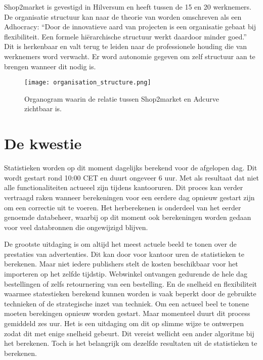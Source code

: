 Shop2market is gevestigd in Hilversum en heeft tussen de 15 en 20 werknemers. De organisatie structuur kan naar de theorie van
\autocite{mintzberg} worden omschreven als een Adhocracy: “Door de innovatieve aard van projecten is een organisatie gebaat bij flexibiliteit. Een formele hiërarchische structuur werkt daardoor minder goed.” Dit is herkenbaar en valt terug te leiden naar de professionele houding die van werknemers word verwacht. Er word autonomie gegeven om zelf structuur aan te brengen wanneer dit nodig is.


\begin{figure}[h]
    \texttt{[image: organisation\_structure.png]}
    \caption{Organogram waarin de relatie tussen Shop2market en Adcurve zichtbaar is.}
    \label{fig:orgchart}
\end{figure}

\section{De kwestie} %

Statistieken worden op dit moment dagelijks berekend voor de afgelopen dag. Dit wordt gestart rond 10:00 CET en duurt ongeveer 6 uur. Met als resultaat dat niet alle functionaliteiten actueeel zijn tijdens kantooruren.
Dit proces kan verder vertraagd raken wanneer berekeningen voor een eerdere dag opnieuw gestart zijn om een correctie uit te voeren. Het herberekenen is onderdeel van het eerder genoemde databeheer, waarbij op dit moment ook berekeningen worden gedaan voor veel databronnen die ongewijzigd blijven.

De grootste uitdaging is om altijd het meest actuele beeld te tonen over de prestaties van advertenties. Dit kan door voor kantoor uren de statistieken te berekenen. Maar niet iedere publishers stelt de kosten beschikbaar voor het importeren op het zelfde tijdstip. Webwinkel ontvangen gedurende de hele dag bestellingen of zelfs retournering van een bestelling. En de snelheid en flexibiliteit waarmee statestieken berekend kunnen worden is vaak beperkt door de gebruikte technieken of de strategische inzet van techniek. Om een actueel beel te tonene moeten berekingen opnieuw worden gestart. Maar momenteel duurt dit process gemiddeld zes uur. Het is een uitdaging om dit op slimme wijze te ontwerpen zodat dit met enige snelheid gebeurt. Dit vereist wellicht een ander algoritme bij het berekenen. Toch is het belangrijk om dezelfde resultaten uit de statistieken te berekenen.

